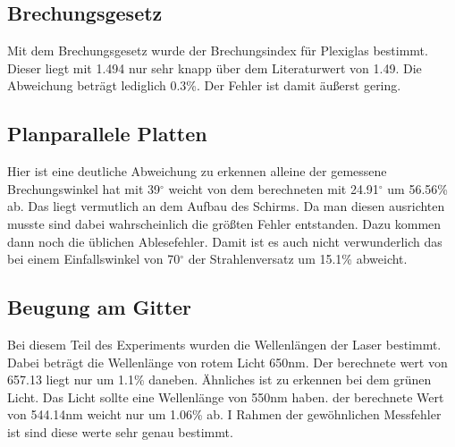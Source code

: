 \subsection{Brechungsgesetz}

Mit dem Brechungsgesetz wurde der Brechungsindex für Plexiglas bestimmt. Dieser liegt mit 1.494 nur sehr knapp über dem Literaturwert von 1.49. Die Abweichung beträgt lediglich 0.3\%. Der Fehler ist damit äußerst gering.

\subsection{Planparallele Platten}

Hier ist eine deutliche Abweichung zu erkennen alleine der gemessene Brechungswinkel hat mit 39$^\circ$ weicht von dem berechneten mit 24.91$^\circ$ um 56.56\% ab. Das liegt vermutlich an dem Aufbau des Schirms. Da man diesen ausrichten musste sind dabei wahrscheinlich die größten Fehler entstanden. Dazu kommen dann noch die üblichen Ablesefehler. Damit ist es auch nicht verwunderlich das bei einem Einfallswinkel von 70$^\circ$ der Strahlenversatz um 15.1\% abweicht.

\subsection{Beugung am Gitter}

Bei diesem Teil des Experiments wurden die  Wellenlängen der Laser bestimmt. Dabei beträgt die Wellenlänge von rotem Licht 650nm. Der berechnete wert von 657.13 liegt nur um 1.1\% daneben. Ähnliches ist zu erkennen bei dem grünen Licht. Das Licht sollte eine Wellenlänge von 550nm haben. der berechnete Wert von 544.14nm weicht  nur um 1.06\% ab. I Rahmen der gewöhnlichen Messfehler ist sind diese werte sehr genau bestimmt.

